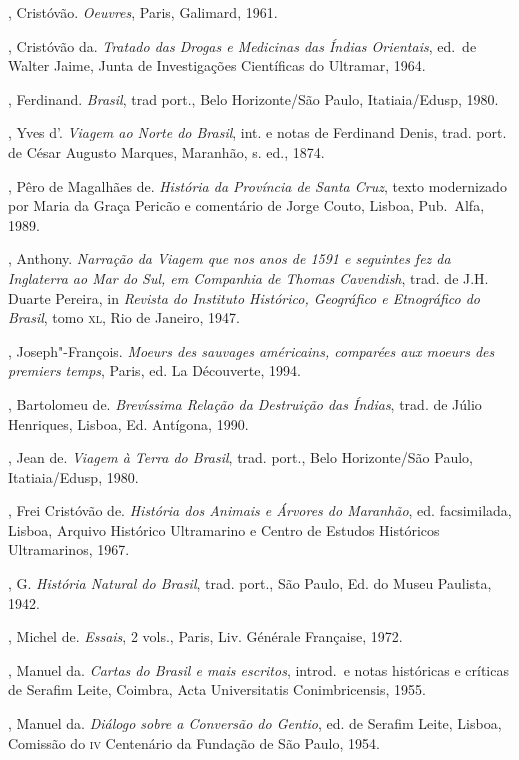 \begin{bibliohedra}
, Cristóvão. \textit{Oeuvres}, Paris, Galimard, 1961.

, Cristóvão da. \textit{Tratado das Drogas e Medicinas das Índias
Orientais}, ed.~de Walter Jaime, Junta de Investigações Científicas do Ultramar, 1964.

, Ferdinand. \textit{Brasil}, trad port., Belo
Horizonte/São Paulo, Itatiaia/Edusp, 1980.

, Yves d'. \textit{Viagem ao Norte do Brasil}, int. e notas de
Ferdinand Denis, trad. port. de César Augusto Marques, Maranhão, s. ed., 1874.

, Pêro de Magalhães de. \textit{História da Província de Santa
Cruz}, texto modernizado por Maria da Graça Pericão e comentário de
Jorge Couto, Lisboa, Pub.~Alfa, 1989.

, Anthony. \textit{Narração da Viagem que nos anos de 1591 e
seguintes fez da Inglaterra ao Mar do Sul, em Companhia de Thomas
Cavendish}, trad. de J.H. Duarte Pereira, in \textit{Revista do
Instituto Histórico, Geográfico e Etnográfico do Brasil}, tomo \textsc{xl}, Rio de Janeiro, 1947.

, Joseph"-François. \textit{Moeurs des sauvages américains,
comparées aux moeurs des premiers temps}, Paris, ed. La Découverte, 1994.

, Bartolomeu de. \textit{Brevíssima Relação da Destruição das
Índias}, trad. de Júlio Henriques, Lisboa, Ed. Antígona, 1990.

, Jean de. \textit{Viagem à Terra do Brasil}, trad. port., Belo
Horizonte/São Paulo, Itatiaia/Edusp, 1980.

, Frei Cristóvão de. \textit{História dos Animais e Árvores do
Maranhão}, ed. facsimilada, Lisboa, Arquivo Histórico Ultramarino e
Centro de Estudos Históricos Ultramarinos, 1967.

, G. \textit{História Natural do Brasil}, trad. port., São
Paulo, Ed. do Museu Paulista, 1942.

, Michel de. \textit{Essais}, 2 vols., Paris, Liv. Générale Française, 1972.

, Manuel da. \textit{Cartas do Brasil e mais escritos}, introd.~e 
notas históricas e críticas de Serafim Leite, Coimbra, Acta Universitatis Conimbricensis, 1955.

, Manuel da. \textit{Diálogo sobre a Conversão do Gentio}, ed.
de Serafim Leite, Lisboa, Comissão do \textsc{iv} Centenário da Fundação de São Paulo, 1954.


\end{bibliohedra}
